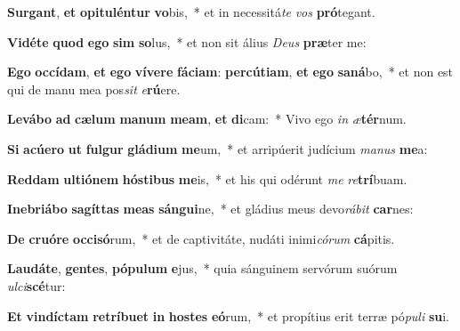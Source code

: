 \item \textbf{Sur}\textbf{gant}, \textbf{et} \textbf{o}\textbf{pi}\textbf{tu}\textbf{lén}\textbf{tur} \textbf{vo}bis,~* et in necessitá\textit{te} \textit{vos} \textbf{pró}tegant.
\item \textbf{Vi}\textbf{dé}\textbf{te} \textbf{quod} \textbf{e}\textbf{go} \textbf{sim} \textbf{so}lus,~* et non sit álius \textit{De}\textit{us} \textbf{præ}ter me:
\item \textbf{E}\textbf{go} \textbf{oc}\textbf{cí}\textbf{dam}, \textbf{et} \textbf{e}\textbf{go} \textbf{ví}\textbf{ve}\textbf{re} \textbf{fá}\textbf{ci}\textbf{am}: \textbf{per}\textbf{cú}\textbf{ti}\textbf{am}, \textbf{et} \textbf{e}\textbf{go} \textbf{sa}\textbf{ná}bo,~* et non est qui de manu mea pos\textit{sit} \textit{e}\textbf{rú}ere.
\item \textbf{Le}\textbf{vá}\textbf{bo} \textbf{ad} \textbf{cæ}\textbf{lum} \textbf{ma}\textbf{num} \textbf{me}\textbf{am}, \textbf{et} \textbf{di}cam:~* Vivo ego \textit{in} \textit{æ}\textbf{tér}num.
\item \textbf{Si} \textbf{a}\textbf{cú}\textbf{e}\textbf{ro} \textbf{ut} \textbf{ful}\textbf{gur} \textbf{glá}\textbf{di}\textbf{um} \textbf{me}um,~* et arripúerit judícium \textit{ma}\textit{nus} \textbf{me}a:
\item \textbf{Red}\textbf{dam} \textbf{ul}\textbf{ti}\textbf{ó}\textbf{nem} \textbf{hós}\textbf{ti}\textbf{bus} \textbf{me}is,~* et his qui odérunt \textit{me} \textit{re}\textbf{trí}buam.
\item \textbf{In}\textbf{e}\textbf{bri}\textbf{á}\textbf{bo} \textbf{sa}\textbf{gít}\textbf{tas} \textbf{me}\textbf{as} \textbf{sán}\textbf{gui}ne,~* et gládius meus devo\textit{rá}\textit{bit} \textbf{car}nes:
\item \textbf{De} \textbf{cru}\textbf{ó}\textbf{re} \textbf{oc}\textbf{ci}\textbf{só}rum,~* et de captivitáte, nudáti inimi\textit{có}\textit{rum} \textbf{cá}pitis.
\item \textbf{Lau}\textbf{dá}\textbf{te}, \textbf{gen}\textbf{tes}, \textbf{pó}\textbf{pu}\textbf{lum} \textbf{e}jus,~* quia sánguinem servórum suórum \textit{ul}\textit{ci}\textbf{scé}tur:
\item \textbf{Et} \textbf{vin}\textbf{díc}\textbf{tam} \textbf{re}\textbf{trí}\textbf{bu}\textbf{et} \textbf{in} \textbf{hos}\textbf{tes} \textbf{e}\textbf{ó}rum,~* et propítius erit terræ pó\textit{pu}\textit{li} \textbf{su}i.
